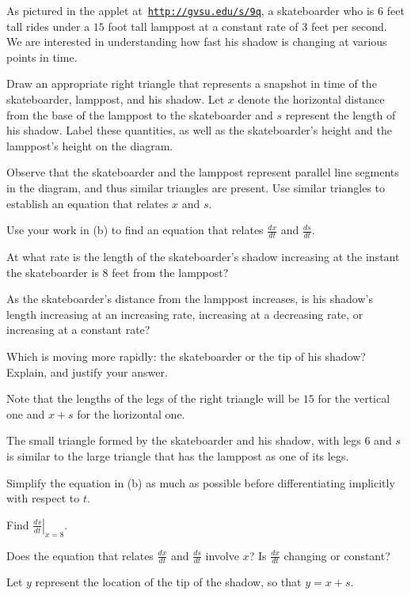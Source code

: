\begin{activity} \label{A:3.1.3}  As pictured in the applet at~\href{http://gvsu.edu/s/9q}{\texttt{http://gvsu.edu/s/9q}}, a skateboarder who is $6$ feet tall rides under a $15$ foot tall lamppost at a constant rate of $3$ feet per second.  We are interested in understanding how fast his shadow is changing at various points in time.
\ba
	\item Draw an appropriate right triangle that represents a snapshot in time of the skateboarder, lamppost, and his shadow.  Let $x$ denote the horizontal distance from the base of the lamppost to the skateboarder and $s$ represent the length of his shadow.  Label these quantities, as well as the skateboarder's height and the lamppost's height on the diagram.
	\item Observe that the skateboarder and the lamppost represent parallel line segments in the diagram, and thus similar triangles are present.  Use similar triangles to establish an equation that relates $x$ and $s$.
	\item Use your work in (b) to find an equation that relates $\frac{dx}{dt}$ and $\frac{ds}{dt}$.
	\item At what rate is the length of the skateboarder's shadow increasing at the instant the skateboarder is $8$ feet from the lamppost?
	\item As the skateboarder's distance from the lamppost increases, is his shadow's length increasing at an increasing rate, increasing at a decreasing rate, or increasing at a constant rate?
	\item Which is moving more rapidly:  the skateboarder or the tip of his shadow?  Explain, and justify your answer.
\ea
\end{activity}
\begin{smallhint}
\ba
	\item Note that the lengths of the legs of the right triangle will be $15$ for the vertical one and $x + s$ for the horizontal one.
	\item The small triangle formed by the skateboarder and his shadow, with legs $6$ and $s$ is similar to the large triangle that has the lamppost as one of its legs.
	\item Simplify the equation in (b) as much as possible before differentiating implicitly with respect to $t$.
	\item Find $\left. \frac{ds}{dt} \right|_{x=8}$.
	\item Does the equation that relates $\frac{dx}{dt}$ and $\frac{ds}{dt}$ involve $x$?  Is $\frac{dx}{dt}$ changing or constant?
	\item Let $y$ represent the location of the tip of the shadow, so that $y = x + s$.
\ea
\end{smallhint}

